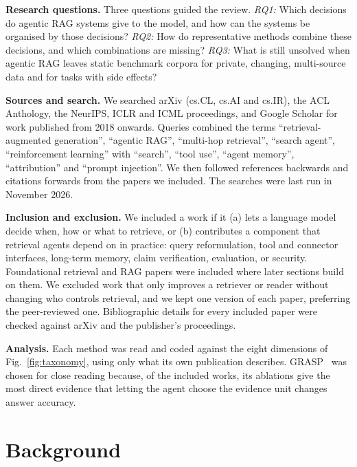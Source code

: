 \documentclass[pdflatex,sn-mathphys-num]{sn-jnl}%
\begin{document}
\textbf{Research questions.} Three questions guided the review.
\emph{RQ1:} Which decisions do agentic RAG systems give to the model, and how can the systems be organised by those decisions?
\emph{RQ2:} How do representative methods combine these decisions, and which combinations are missing?
\emph{RQ3:} What is still unsolved when agentic RAG leaves static benchmark corpora for private, changing, multi-source data and for tasks with side effects?

\textbf{Sources and search.} We searched arXiv (cs.CL, cs.AI and cs.IR), the ACL Anthology, the NeurIPS, ICLR and ICML proceedings, and Google Scholar for work published from 2018 onwards. Queries combined the terms ``retrieval-augmented generation'', ``agentic RAG'', ``multi-hop retrieval'', ``search agent'', ``reinforcement learning'' with ``search'', ``tool use'', ``agent memory'', ``attribution'' and ``prompt injection''. We then followed references backwards and citations forwards from the papers we included. The searches were last run in November 2026.

\textbf{Inclusion and exclusion.} We included a work if it (a) lets a language model decide when, how or what to retrieve, or (b) contributes a component that retrieval agents depend on in practice: query reformulation, tool and connector interfaces, long-term memory, claim verification, evaluation, or security. Foundational retrieval and RAG papers were included where later sections build on them. We excluded work that only improves a retriever or reader without changing who controls retrieval, and we kept one version of each paper, preferring the peer-reviewed one. Bibliographic details for every included paper were checked against arXiv and the publisher's proceedings.

\textbf{Analysis.} Each method was read and coded against the eight dimensions of Fig.~\ref{fig:taxonomy}, using only what its own publication describes. GRASP~\cite{gandhi2026grasp} was chosen for close reading because, of the included works, its ablations give the most direct evidence that letting the agent choose the evidence unit changes answer accuracy.

\section{Background}
\label{sec:background}
\end{document}

